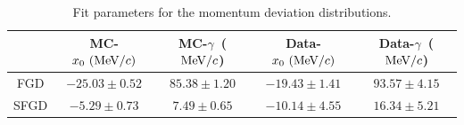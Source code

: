           \begin{table}[htbp]
          \centering
          \begin{tabular}{c|cccc}
                       & MC-$x_0~(\textrm{MeV}/c)$ & MC-$\gamma$~($\textrm{MeV}/c$) & Data-$x_0~(\textrm{MeV}/c)$ & Data-$\gamma$~($\textrm{MeV}/c$)\\
          \hline
          FGD & $-25.03 \pm 0.52$ & $85.38 \pm 1.20$ & $-19.43 \pm 1.41$ & $93.57 \pm 4.15$ \\
          SFGD & $-5.29 \pm 0.73$  & $7.49 \pm 0.65$  & $-10.14 \pm 4.55$  & $16.34 \pm 5.21$ \\
          \end{tabular}
          \caption{Fit parameters for the momentum deviation distributions.}
          \label{tab:sppi-res}
          \end{table}

